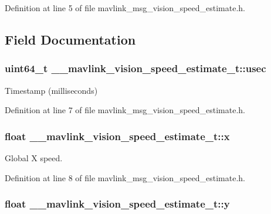 Definition at line 5 of file mavlink\-\_\-msg\-\_\-vision\-\_\-speed\-\_\-estimate.\-h.



\subsection{Field Documentation}
\hypertarget{struct____mavlink__vision__speed__estimate__t_adfc952857e519d31dfaa6f3cdd153843}{
\subsubsection[{usec}]{\setlength{\rightskip}{0pt plus 5cm}uint64\-\_\-t \-\_\-\-\_\-mavlink\-\_\-vision\-\_\-speed\-\_\-estimate\-\_\-t\-::usec}}\label{struct____mavlink__vision__speed__estimate__t_adfc952857e519d31dfaa6f3cdd153843}


Timestamp (milliseconds) 



Definition at line 7 of file mavlink\-\_\-msg\-\_\-vision\-\_\-speed\-\_\-estimate.\-h.

\hypertarget{struct____mavlink__vision__speed__estimate__t_a8fcd91c8bacb70d5b1bd6df87fb01a5a}{
\subsubsection[{x}]{\setlength{\rightskip}{0pt plus 5cm}float \-\_\-\-\_\-mavlink\-\_\-vision\-\_\-speed\-\_\-estimate\-\_\-t\-::x}}\label{struct____mavlink__vision__speed__estimate__t_a8fcd91c8bacb70d5b1bd6df87fb01a5a}


Global X speed. 



Definition at line 8 of file mavlink\-\_\-msg\-\_\-vision\-\_\-speed\-\_\-estimate.\-h.

\hypertarget{struct____mavlink__vision__speed__estimate__t_ae2bcf3949b4e0ac7d21b4bc886fea08c}{
\subsubsection[{y}]{\setlength{\rightskip}{0pt plus 5cm}float \-\_\-\-\_\-mavlink\-\_\-vision\-\_\-speed\-\_\-estimate\-\_\-t\-::y}}\label{struct____mavlink__vision__speed__estimate__t_ae2bcf3949b4e0ac7d21b4bc886fea08c}


